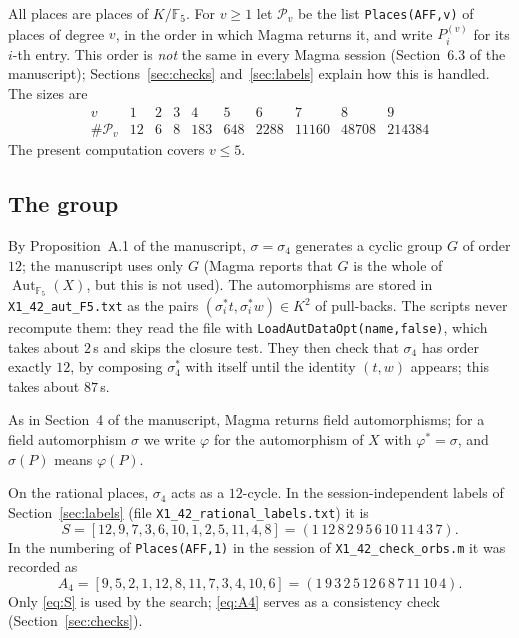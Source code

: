 \documentclass[11pt]{amsart}
\theoremstyle{definition}
\theoremstyle{remark}
\newcommand{\F}{\mathbb{F}}
\newcommand{\Aut}{\operatorname{Aut}}
\newcommand{\Pl}{\mathcal{P}}
\newcommand{\code}[1]{\texttt{#1}}
\begin{document}
All places are places of $K/\F_5$. For $v\ge1$ let $\Pl_v$ be the list \code{Places(AFF,v)} of places of degree $v$, in the order in which Magma returns it, and write $P^{(v)}_i$ for its $i$-th entry. This order is \emph{not} the same in every Magma session (Section~6.3 of the manuscript); Sections~\ref{sec:checks} and~\ref{sec:labels} explain how this is handled. The sizes are
\[
\begin{array}{c|ccccccccc}
v & 1&2&3&4&5&6&7&8&9\\\hline
\#\Pl_v & 12&6&8&183&648&2288&11160&48708&214384
\end{array}
\]
The present computation covers $v\le5$.

\subsection{The group}
By Proposition~A.1 of the manuscript, $\sigma=\sigma_4$ generates a cyclic group $G$ of order $12$; the manuscript uses only $G$ (Magma reports that $G$ is the whole of $\Aut_{\F_5}(X)$, but this is not used). The automorphisms are stored in \code{X1\_42\_aut\_F5.txt} as the pairs $(\sigma_i^*t,\sigma_i^*w)\in K^2$ of pull-backs. The scripts never recompute them: they read the file with \code{LoadAutDataOpt(name,false)}, which takes about $2$\,s and skips the closure test. They then check that $\sigma_4$ has order exactly $12$, by composing $\sigma_4^*$ with itself until the identity $(t,w)$ appears; this takes about $87$\,s.

As in Section~4 of the manuscript, Magma returns field automorphisms; for a field automorphism $\sigma$ we write $\varphi$ for the automorphism of $X$ with $\varphi^*=\sigma$, and $\sigma(P)$ means $\varphi(P)$.

On the rational places, $\sigma_4$ acts as a $12$-cycle. In the session-independent labels of Section~\ref{sec:labels} (file \code{X1\_42\_rational\_labels.txt}) it is
\begin{equation}\label{eq:S}
S=[12,9,7,3,6,10,1,2,5,11,4,8]=(1\,12\,8\,2\,9\,5\,6\,10\,11\,4\,3\,7).
\end{equation}
In the numbering of \code{Places(AFF,1)} in the session of \code{X1\_42\_check\_orbs.m} it was recorded as
\begin{equation}\label{eq:A4}
A_4=[9,5,2,1,12,8,11,7,3,4,10,6]=(1\,9\,3\,2\,5\,12\,6\,8\,7\,11\,10\,4).
\end{equation}
Only \eqref{eq:S} is used by the search; \eqref{eq:A4} serves as a consistency check (Section~\ref{sec:checks}).
\end{document}
